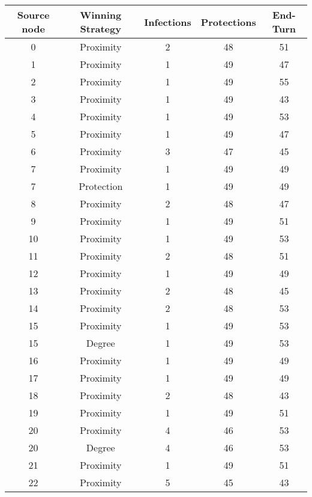 \documentclass[results.tex]{subfiles}
\begin{document}
\begin{center}
  \begin{tabular}{| c || c | c | c | c |}
    \hline
    {\bfseries Source node} & {\bfseries Winning Strategy} & {\bfseries Infections} & {\bfseries Protections} & {\bfseries End-Turn} \\  %
    \hline\hline
    0 & Proximity & 2 & 48 & 51 \\ 
    \hline
    1 & Proximity & 1 & 49 & 47 \\ 
    \hline
    2 & Proximity & 1 & 49 & 55 \\ 
    \hline
    3 & Proximity & 1 & 49 & 43 \\ 
    \hline
    4 & Proximity & 1 & 49 & 53 \\ 
    \hline
    5 & Proximity & 1 & 49 & 47 \\ 
    \hline
    6 & Proximity & 3 & 47 & 45 \\ 
    \hline
    7 & Proximity & 1 & 49 & 49 \\ 
    \hline
    7 & Protection & 1 & 49 & 49 \\ 
    \hline
    8 & Proximity & 2 & 48 & 47 \\ 
    \hline
    9 & Proximity & 1 & 49 & 51 \\ 
    \hline
    10 & Proximity & 1 & 49 & 53 \\ 
    \hline
    11 & Proximity & 2 & 48 & 51 \\ 
    \hline
    12 & Proximity & 1 & 49 & 49 \\ 
    \hline
    13 & Proximity & 2 & 48 & 45 \\ 
    \hline
    14 & Proximity & 2 & 48 & 53 \\ 
    \hline
    15 & Proximity & 1 & 49 & 53 \\ 
    \hline
    15 & Degree & 1 & 49 & 53 \\ 
    \hline
    16 & Proximity & 1 & 49 & 49 \\ 
    \hline
    17 & Proximity & 1 & 49 & 49 \\ 
    \hline
    18 & Proximity & 2 & 48 & 43 \\ 
    \hline
    19 & Proximity & 1 & 49 & 51 \\ 
    \hline
    20 & Proximity & 4 & 46 & 53 \\ 
    \hline
    20 & Degree & 4 & 46 & 53 \\ 
    \hline
    21 & Proximity & 1 & 49 & 51 \\ 
    \hline
    22 & Proximity & 5 & 45 & 43 \\ 

\end{tabular}
\end{center}
\end{document}
